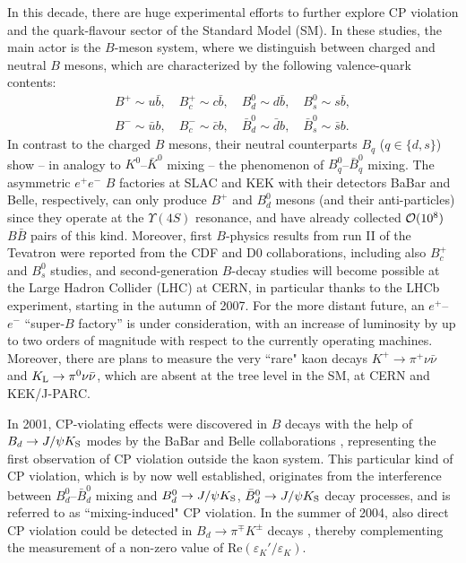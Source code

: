 \documentclass[11pt]{cernrep}
\begin{document}
In this decade, there are huge experimental efforts to further 
explore CP violation and the quark-flavour sector of the Standard Model 
(SM). In these studies, the main actor is
the $B$-meson system, where we distinguish between charged and neutral 
$B$ mesons, which are characterized by the following valence-quark contents:
\begin{equation}\label{B-valence}
\begin{array}{c}
B^+\sim u \bar b, \quad B^+_c\sim c \bar b, \quad B^0_d\sim d \bar b, \quad
B^0_s\sim s \bar b, \\
B^-\sim \bar u b, \quad B^-_c\sim \bar c b, \quad \bar B^0_d\sim \bar d  b, \quad
\bar B^0_s\sim \bar s  b.
\end{array}
\end{equation}
In contrast to the charged $B$ mesons, their neutral counterparts
$B_q$ ($q\in \{d,s\}$) show
-- in analogy to $K^0$--$\bar K^0$ mixing -- the phenomenon of 
$B_q^0$--$\bar B_q^0$ mixing.
The asymmetric $e^+e^-$ $B$ factories at SLAC and KEK with their detectors 
BaBar and Belle, respectively, can only produce $B^+$ and $B^0_d$ mesons 
(and their anti-particles) since they operate at the $\Upsilon(4S)$ resonance, 
and have already collected ${\cal O}(10^8)$ $B\bar B$ pairs of this kind.
Moreover, first $B$-physics results from run II of the Tevatron were 
reported from the CDF and D0 collaborations, including also $B^+_c$
and $B^0_s$ studies, and second-generation $B$-decay
studies will become possible at the Large Hadron Collider (LHC)
at CERN, in particular thanks to the LHCb experiment, starting in the 
autumn of 2007. For the more distant future,
an $e^+$--$e^-$ ``super-$B$ factory'' is under consideration, with an
increase of luminosity by up to two orders of magnitude with respect to the 
currently operating machines. Moreover, there are plans to measure the 
very ``rare" kaon decays $K^+\to\pi^+\nu\bar\nu$ and $K_{\rm L}\to\pi^0\nu\bar\nu$, which are absent at the tree level in the SM, at CERN and KEK/J-PARC. 

In 2001, CP-violating effects were discovered in $B$ decays 
with the help of $B_d\to J/\psi K_{\rm S}$ modes by the BaBar and Belle 
collaborations \cite{CP-B-obs}, representing the first observation of CP violation 
outside the kaon system. This particular kind of CP violation, which is by
now well established, originates from the interference between 
$B^0_d$--$\bar B^0_d$ mixing and $B^0_d\to J/\psi K_{\rm S}$, 
$\bar B^0_d\to J/\psi K_{\rm S}$ decay processes, and is referred to as 
``mixing-induced" CP violation. In the summer of 2004, also direct CP 
violation could be detected in $B_d\to\pi^\mp K^\pm$ decays \cite{CP-B-dir}, 
thereby complementing the measurement of a non-zero
value of $\mbox{Re}(\varepsilon_K'/\varepsilon_K)$.
\end{document}

